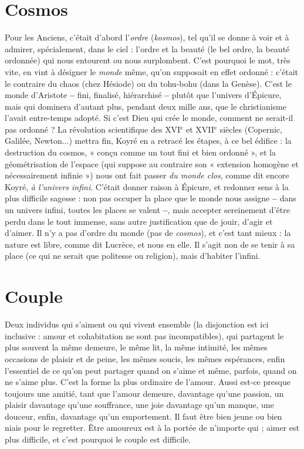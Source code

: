 \section{Cosmos}
Pour les Anciens, c'était d’abord l’{\it ordre} ({\it kosmos}), tel qu'il se
donne à voir et à admirer, spécialement, dans le ciel : l’ordre et
la beauté (le bel ordre, la beauté ordonnée) qui nous entourent ou nous surplombent.
C’est pourquoi le mot, très vite, en vint à désigner le {\it monde} même,
qu’on supposait en effet ordonné : c'était le contraire du chaos (chez Hésiode)
ou du tohu-bohu (dans la Genèse). C’est le monde d’Aristote {\bf --} fini, finalisé,
hiérarchisé {\bf --} plutôt que l’univers d’Épicure, mais qui dominera d’autant plus,
pendant deux mille ans, que le christianisme l’avait entre-temps adopté. Si c’est
Dieu qui crée le monde, comment ne serait-il pas ordonné ? La révolution
scientifique des {\footnotesize XVI$^\text{e}$} et {\footnotesize XVII$^\text{e}$}
siècles (Copernic, Galilée, Newton...) mettra fin,
Koyré en a retracé les étapes, à ce bel édifice : la destruction du cosmos, « conçu
comme un tout fini et bien ordonné », et la géométrisation de l’espace (qui
suppose au contraire son « extension homogène et nécessairement infinie »)
nous ont fait passer {\it du monde clos}, comme dit encore Koyré, {\it à l'univers infini}.
C'était donner raison à Épicure, et redonner sens à la plus difficile sagesse : non
pas occuper la place que le monde nous assigne {\bf --} dans un univers infini, toutes
les places se valent {\bf --}, mais accepter sereinement d’être perdu dans le tout
immense, sans autre justification que de jouir, d’agir et d’aimer. Il n’y a pas
d'ordre du monde (pas de {\it cosmos}), et c’est tant mieux : la nature est libre,
comme dit Lucrèce, et nous en elle. Il s’agit non de se tenir à sa place (ce qui
ne serait que politesse ou religion), mais d’habiter l'infini.

\section{Couple}
Deux individus qui s’aiment ou qui vivent ensemble (la disjonction
est ici inclusive : amour et cohabitation ne sont pas incompatibles),
qui partagent le plus souvent la même demeure, le même lit, la même
intimité, les mêmes occasions de plaisir et de peine, les mêmes soucis, les
mêmes espérances, enfin l'essentiel de ce qu’on peut partager quand on s’aime
et même, parfois, quand on ne s'aime plus. C’est la forme la plus ordinaire de
l'amour. Aussi est-ce presque toujours une amitié, tant que l’amour demeure,
davantage qu’une passion, un plaisir davantage qu’une souffrance, une joie
davantage qu’un manque, une douceur, enfin, davantage qu’un emportement.
Il faut être bien jeune ou bien niais pour le regretter. Être amoureux est à la
portée de n'importe qui ; aimer est plus difficile, et c’est pourquoi le couple est
difficile.

